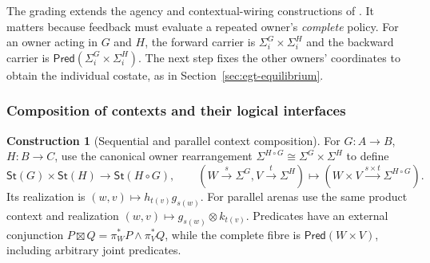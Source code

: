 \documentclass[11pt,a4paper]{article}
\numberwithin{equation}{section}
\theoremstyle{definition}
\newtheorem{construction}[construction]{Construction}
\theoremstyle{remark}
\theoremstyle{plain}
\begin{document}
The grading extends the agency and contextual-wiring constructions of
\citet{CapucciEtAl2022Agency,CapucciEtAl2022Cybernetics,Hedges2020}.
It matters because feedback must evaluate a repeated owner's 
\emph{complete} policy. For an owner acting in $G$ and $H$, the forward
carrier is $\Sigma_i^G\times\Sigma_i^H$ and the backward carrier is
$\mathsf{Pred}(\Sigma_i^G\times\Sigma_i^H)$. The next step fixes the
other owners' coordinates to obtain the individual costate, as in
Section~\ref{sec:egt-equilibrium}.

\subsubsection{Composition of contexts and their logical interfaces}

\begin{construction}[Sequential and parallel context composition]
\label{con:fib-context-composition}
For $G:A\to B$, $H:B\to C$, use the canonical owner rearrangement
$\Sigma^{H\circ G}\cong\Sigma^G\times\Sigma^H$ to define
\[
 \mathsf{St}(G)\times\mathsf{St}(H)\longrightarrow
 \mathsf{St}(H\circ G),\qquad
 (W\xrightarrow{s}\Sigma^G,V\xrightarrow{t}\Sigma^H)
 \longmapsto(W\times V\xrightarrow{s\times t}\Sigma^{H\circ G}).
\]
Its realization is $(w,v)\mapsto h_{t(v)}g_{s(w)}$.
For parallel arenas use the same product context and realization
$(w,v)\mapsto g_{s(w)}\otimes k_{t(v)}$.
Predicates have an external conjunction
$P\boxtimes Q=\pi_W^*P\wedge\pi_V^*Q$, while the complete fibre
is $\mathsf{Pred}(W\times V)$, including arbitrary joint predicates.
\end{construction}
\end{document}
